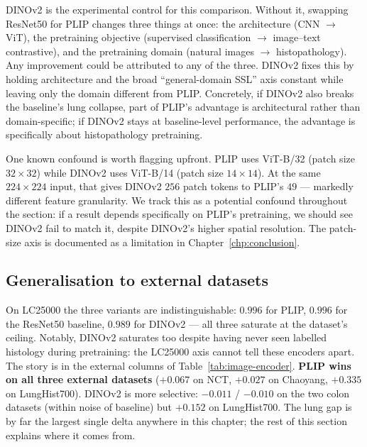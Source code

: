 DINOv2 is the experimental control for this comparison. Without it, swapping ResNet50 for PLIP changes three things at once: the architecture (CNN $\rightarrow$ ViT), the pretraining objective (supervised classification $\rightarrow$ image--text contrastive), and the pretraining domain (natural images $\rightarrow$ histopathology). Any improvement could be attributed to any of the three. DINOv2 fixes this by holding architecture and the broad ``general-domain SSL'' axis constant while leaving only the domain different from PLIP. Concretely, if DINOv2 also breaks the baseline's lung collapse, part of PLIP's advantage is architectural rather than domain-specific; if DINOv2 stays at baseline-level performance, the advantage is specifically about histopathology pretraining.

One known confound is worth flagging upfront. PLIP uses ViT-B/32 (patch size $32 \times 32$) while DINOv2 uses ViT-B/14 (patch size $14 \times 14$). At the same $224 \times 224$ input, that gives DINOv2 $256$ patch tokens to PLIP's $49$ --- markedly different feature granularity. We track this as a potential confound throughout the section: if a result depends specifically on PLIP's pretraining, we should see DINOv2 fail to match it, despite DINOv2's higher spatial resolution. The patch-size axis is documented as a limitation in Chapter~\ref{chp:conclusion}.

\subsection{Generalisation to external datasets}

On LC25000 the three variants are indistinguishable: $0.996$ for PLIP, $0.996$ for the ResNet50 baseline, $0.989$ for DINOv2 --- all three saturate at the dataset's ceiling. Notably, DINOv2 saturates too despite having never seen labelled histology during pretraining: the LC25000 axis cannot tell these encoders apart. The story is in the external columns of Table~\ref{tab:image-encoder}. \textbf{PLIP wins on all three external datasets} ($+0.067$ on NCT, $+0.027$ on Chaoyang, $+0.335$ on LungHist700). DINOv2 is more selective: $-0.011$ / $-0.010$ on the two colon datasets (within noise of baseline) but $+0.152$ on LungHist700. The lung gap is by far the largest single delta anywhere in this chapter; the rest of this section explains where it comes from.


